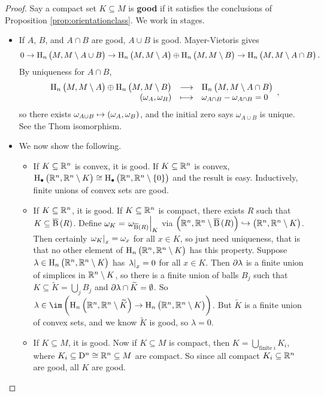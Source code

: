 \begin{proof}
Say a compact set $ K \subseteq M $ is \textbf{good} if it satisfies the conclusions of Proposition \ref{prop:orientationclass}. We work in stages.
\begin{itemize}
\item If $ A $, $ B $, and $ A \cap B $ are good, $ A \cup B $ is good. Mayer-Vietoris gives
$$ 0 \to \H_n\br{M, M \setminus A \cup B} \to \H_n\br{M, M \setminus A} \oplus \H_n\br{M, M \setminus B} \to \H_n\br{M, M \setminus A \cap B}. $$
By uniqueness for $ A \cap B $,
$$ \function{\H_n\br{M, M \setminus A} \oplus \H_n\br{M, M \setminus B}}{\H_n\br{M, M \setminus A \cap B}}{\br{\omega_A, \omega_B}}{\omega_{A \cap B} - \omega_{A \cap B} = 0}, $$
so there exists $ \omega_{A \cup B} \mapsto \br{\omega_A, \omega_B} $, and the initial zero says $ \omega_{A \cup B} $ is unique. See the Thom isomorphism.
\item We now show the following.
\begin{itemize}
\item If $ K \subseteq \mathbb{R}^n $ is convex, it is good. If $ K \subseteq \mathbb{R}^n $ is convex, $ \H_\bullet\br{\RR^n, \RR^n \setminus K} \cong \H_\bullet\br{\RR^n, \RR^n \setminus \cbr{0}} $ and the result is easy. Inductively, finite unions of convex sets are good.
\item If $ K \subseteq \mathbb{R}^n $, it is good. If $ K \subseteq \mathbb{R}^n $ is compact, there exists $ R $ such that $ K \subseteq \overline{\B}\br{R} $. Define $ \omega_K = \eval{\omega_{\overline{\B}\br{R}}}_K $ via $ \br{\RR^n, \RR^n \setminus \overline{\B}\br{R}} \hookrightarrow \br{\RR^n, \RR^n \setminus K} $. Then certainly $ \left. \omega_K \right|_x = \omega_x $ for all $ x \in K $, so just need uniqueness, that is that no other element of $ \H_n\br{\RR^n, \RR^n \setminus K} $ has this property. Suppose $ \lambda \in \H_n\br{\RR^n, \RR^n \setminus K} $ has $ \left. \lambda \right|_x = 0 $ for all $ x \in K $. Then $ \partial\lambda $ is a finite union of simplices in $ \mathbb{R}^n \setminus K $, so there is a finite union of balls $ B_j $ such that $ K \subseteq \widetilde{K} = \bigcup_j B_j $ and $ \partial\lambda \cap \widetilde{K} = \emptyset $. So $ \lambda \in \im \br{\H_n\br{\RR^n, \RR^n \setminus \widetilde{K}} \to \H_n\br{\RR^n, \RR^n \setminus K}} $. But $ \widetilde{K} $ is a finite union of convex sets, and we know $ \widetilde{K} $ is good, so $ \lambda = 0 $.
\item If $ K \subseteq M $, it is good. Now if $ K \subseteq M $ is compact, then $ K = \bigcup_{\text{finite} \ i} K_i $, where $ K_i \subseteq \mathrm{D}^n \cong \mathbb{R}^n \subseteq M $ are compact. So since all compact $ K_i \subseteq \mathbb{R}^n $ are good, all $ K $ are good.
\end{itemize}
\end{itemize}
\end{proof}

